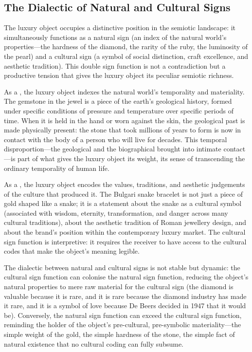 \subsection{The Dialectic of Natural and Cultural Signs}
\label{p16:subsec:dialectic_signs}

\noindent
The luxury object occupies a distinctive position in the semiotic landscape: it simultaneously functions as a natural sign (an index of the natural world's properties---the hardness of the diamond, the rarity of the ruby, the luminosity of the pearl) and a cultural sign (a symbol of social distinction, craft excellence, and aesthetic tradition). This double sign function is not a contradiction but a productive tension that gives the luxury object its peculiar semiotic richness.

As a , the luxury object indexes the natural world's temporality and materiality. The gemstone in the jewel is a piece of the earth's geological history, formed under specific conditions of pressure and temperature over specific periods of time. When it is held in the hand or worn against the skin, the geological past is made physically present: the stone that took millions of years to form is now in contact with the body of a person who will live for decades. This temporal disproportion---the geological and the biographical brought into intimate contact---is part of what gives the luxury object its weight, its sense of transcending the ordinary temporality of human life.

As a , the luxury object encodes the values, traditions, and aesthetic judgements of the culture that produced it. The Bulgari snake bracelet is not just a piece of gold shaped like a snake; it is a statement about the snake as a cultural symbol (associated with wisdom, eternity, transformation, and danger across many cultural traditions), about the aesthetic tradition of Roman jewellery design, and about the brand's position within the contemporary luxury market. The cultural sign function is interpretive: it requires the receiver to have access to the cultural codes that make the object's meaning legible.

The dialectic between natural and cultural signs is not stable but dynamic: the cultural sign function can colonise the natural sign function, reducing the object's natural properties to mere raw material for the cultural sign (the diamond is valuable because it is rare, and it is rare because the diamond industry has made it rare, and it is a symbol of love because De Beers decided in 1947 that it would be). Conversely, the natural sign function can exceed the cultural sign function, reminding the holder of the object's pre-cultural, pre-symbolic materiality---the simple weight of the gold, the simple hardness of the stone, the simple fact of natural existence that no cultural coding can fully subsume.

